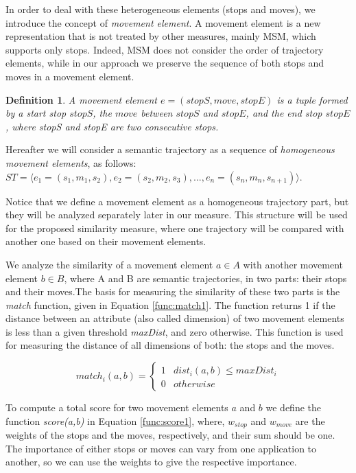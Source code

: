 \documentclass[12pt]{article}
\newtheorem{definition}{Definition}
\begin{document}
In order to deal with these heterogeneous elements (stops and moves), we introduce the concept of \emph{movement element}. A movement element is a new representation that is not treated by other measures, mainly MSM, which supports only stops. Indeed, MSM does not consider the order of trajectory elements, while in our approach we preserve the sequence of both stops and moves in a movement element.

\begin{definition}
\label{def:movement_element}
A movement element  $e=(stopS, move, stopE)$ is a tuple formed by a start stop $stopS$, the $move$ between $stopS$ and  $stopE$, and the end stop $stopE$, where stopS and stopE are two consecutive stops.
\end{definition}


Hereafter we will consider a semantic trajectory as a sequence of \textit{homogeneous movement elements}, as follows: 
$ST=\langle e_1=(s_1,m_1,s_2), e_2=(s_2,m_2,s_3), ..., e_n=(s_n,m_n,s_{n+1}) \rangle$.

Notice that we define a movement element as a homogeneous trajectory part, but they will be analyzed separately later in our measure.
This structure will be used for the proposed similarity measure, where one trajectory will be compared with another one based on their movement elements.



We analyze the similarity of a movement element $a\in A$ with another movement element $b\in B$, where A and B are semantic trajectories, in two parts: their stops and their moves.The basis for measuring the similarity of these two parts is the \emph{match} function, given in Equation \ref{func:match1}. The function returns 1 if the distance between an attribute (also called dimension) of two movement elements is less than a given threshold \emph{maxDist}, and zero otherwise. This function is used for measuring the distance of all dimensions of both: the stops and the moves.

\begin{equation}
\label{func:match1}
  match_i(a, b) = 
  \begin{cases} 
      1 & dist_i(a, b) \leq maxDist_i \\
      0 & otherwise
  \end{cases}
\end{equation}

To compute a total score for two movement elements $a$ and $b$ we define the function \emph{score(a,b)} in Equation \ref{func:score1}, where, $w_{stop}$ and $w_{move}$ are the weights of the stops and the moves, respectively, and their sum should be one. The importance of either stops or moves can vary from one application to another, so we can use the weights to give the respective importance. 
\end{document}
